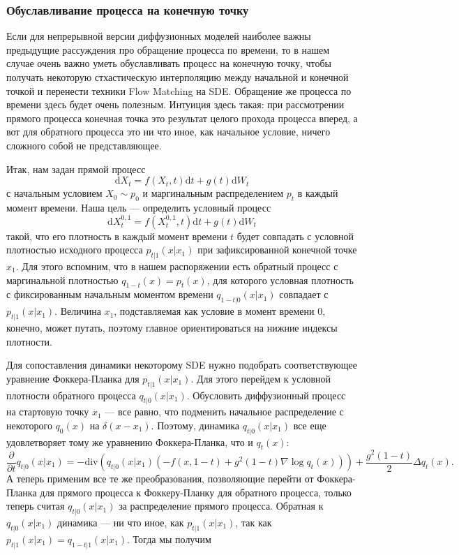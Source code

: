 \documentclass[12pt]{article}
\theoremstyle{definition}
\begin{document}
\subsubsection{Обуславливание процесса на конечную точку}
Если для непрерывной версии диффузионных моделей наиболее важны предыдущие рассуждения про обращение процесса по времени, то в нашем случае очень важно уметь обуславливать процесс на конечную точку, чтобы получать некоторую стхастическую интерполяцию между начальной и конечной точкой и перенести техники Flow Matching на SDE. Обращение же процесса по времени здесь будет очень полезным. Интуиция здесь такая: при рассмотрении прямого процесса конечная точка это результат целого прохода процесса вперед, а вот для обратного процесса это ни что иное, как начальное условие, ничего сложного собой не представляющее.

Итак, нам задан прямой процесс
\[
    \mathrm{d} X_t = f(X_t, t)\mathrm{d} t + g(t)\mathrm{d} W_t
\]
с начальным условием $X_0 \sim p_0$ и маргинальным распределением $p_t$ в каждый момент времени. Наша цель --- определить условный процесс
\[
    \mathrm{d} X^{0, 1}_t = f(X^{0, 1}_t, t)\mathrm{d} t + g(t) \mathrm{d} W_t
\]
такой, что его плотность в каждый момент времени $t$ будет совпадать с условной плотностью исходного процесса $p_{t | 1}(x | x_1)$ при зафиксированной конечной точке $x_1$.
Для этого вспомним, что в нашем распоряжении есть обратный процесс с маргинальной плотностью $q_{1 - t}(x) = p_{t}(x)$, для которого условная плотность с фиксированным начальным моментом времени $q_{1 -t | 0}(x | x_1)$ совпадает с $p_{t | 1}(x | x_1)$. Величина $x_1$, подставляемая как условие в момент времени $0$, конечно, может путать, поэтому главное ориентироваться на нижние индексы плотности.

Для сопоставления динамики некоторому SDE нужно подобрать соответствующее уравнение Фоккера-Планка для $p_{t | 1}(x | x_1)$. Для этого перейдем к условной плотности обратного процесса $q_{t | 0}(x | x_1)$. Обусловить диффузионный процесс на стартовую точку $x_1$ --- все равно, что подменить начальное распределение с некоторого $q_0(x)$ на $\delta(x - x_1)$. Поэтому, динамика $q_{t | 0}(x | x_1)$ все еще удовлетворяет тому же уравнению Фоккера-Планка, что и $q_{t}(x)$:
\[
    \frac{\partial}{\partial t} q_{t | 0}(x | x_1) = -\text{div}\left(q_{t | 0}(x | x_1)\left(- f(x, 1 - t) + g^2(1-t)\nabla \log q_t(x)\right)\right) + \frac{g^2(1 - t)}{2} \Delta q_t(x).
\]
А теперь применим все те же преобразования, позволяющие перейти от Фоккера-Планка для прямого процесса к Фоккеру-Планку для обратного процесса, только теперь считая $q_{t | 0}(x | x_1)$ за распределение прямого процесса. Обратная к $q_{t | 0}(x | x_1)$ динамика --- ни что иное, как $p_{t | 1}(x | x_1)$, так как $p_{t | 1}(x | x_1) = q_{1 - t | 1}(x | x_1)$. Тогда мы получим
\end{document}
